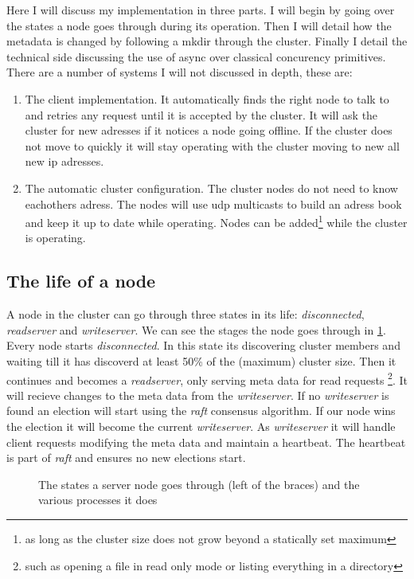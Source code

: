 Here I will discuss my implementation in three parts. I will begin by going over the states a node goes through during its operation. Then I will detail how the metadata is changed by following a mkdir through the cluster. Finally I detail the technical side discussing the use of async over classical concurency primitives.
There are a number of systems I will not discussed in depth, these are:

\begin{enumerate}
	\item The client implementation. It automatically finds the right node to talk to and retries any request until it is accepted by the cluster. It will ask the cluster for new adresses if it notices a node going offline. If the cluster does not move to quickly it will stay operating with the cluster moving to new all new ip adresses.
	\item The automatic cluster configuration. The cluster nodes do not need to know eachothers adress. The nodes will use udp multicasts to build an adress book and keep it up to date while operating. Nodes can be added\footnote{as long as the cluster size does not grow beyond a statically set maximum} while the cluster is operating.
\end{enumerate}

\subsection{The life of a node}
A node in the cluster can go through three states in its life: \textit{disconnected}, \textit{readserver} and \textit{writeserver}. We can see the stages the node goes through in \cref{fig:nodelife}. Every node starts \textit{disconnected}. In this state its discovering cluster members and waiting till it has discoverd at least 50\% of the (maximum) cluster size. Then it continues and becomes a \textit{readserver}, only serving meta data for read requests \footnote{such as opening a file in read only mode or listing everything in a directory}. It will recieve changes to the meta data from the \textit{writeserver}. If no \textit{writeserver} is found an election will start using the \textit{raft}\cite{raft} consensus algorithm. If our node wins the election it will become the current \textit{writeserver}. As \textit{writeserver} it will handle client requests modifying the meta data and maintain a heartbeat. The heartbeat is part of \textit{raft} and ensures no new elections start.

\begin{figure}[htbp]
	\centering
	
	\caption{The states a server node goes through (left of the braces) and the various processes it does}
	\label{fig:nodelife}
\end{figure}


